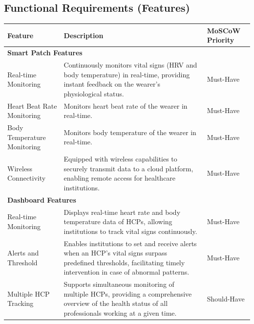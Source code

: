 \subsection{Functional Requirements (Features)}
\begin{table}[h]
    \centering
    \begin{tabularx}{\textwidth}{|p{3cm}|X|p{2cm}|}
        \hline
        \textbf{Feature}
        & \textbf{Description}
        & \textbf{MoSCoW Priority} \\ \hline
        
        \multicolumn{3}{|l|}{\textbf{Smart Patch Features}} \\ \hline

        Real-time Monitoring
        & Continuously monitors vital signs (HRV and body temperature) in real-time, providing instant feedback on the wearer's physiological status.
        & Must-Have \\ \hline

        Heart Beat Rate Monitoring
        & Monitors heart beat rate of the wearer in real-time.
        & Must-Have \\ \hline

        Body Temperature Monitoring
        & Monitors body temperature of the wearer in real-time.
        & Must-Have \\ \hline

        Wireless Connectivity
        & Equipped with wireless capabilities to securely transmit data to a cloud platform, enabling remote access for healthcare institutions.
        & Must-Have \\ \hline

        \multicolumn{3}{|l|}{\textbf{Dashboard Features}} \\ \hline

        Real-time Monitoring
        & Displays real-time heart rate and body temperature data of HCPs, allowing institutions to track vital signs continuously.
        & Must-Have \\ \hline

        Alerts and Threshold
        & Enables institutions to set and receive alerts when an HCP's vital signs surpass predefined thresholds, facilitating timely intervention in case of abnormal patterns.
        & Must-Have \\ \hline

        Multiple HCP Tracking
        & Supports simultaneous monitoring of multiple HCPs, providing a comprehensive overview of the health status of all professionals working at a given time.
        & Should-Have \\ \hline


\end{tabularx}
\end{table}
